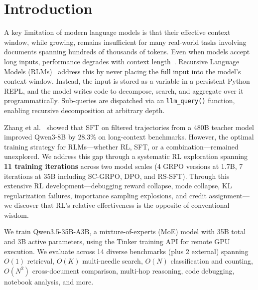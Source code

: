 \documentclass{article}
\begin{document}
\section{Introduction}
\label{sec:intro}

A key limitation of modern language models is that their effective context window, while growing, remains insufficient for many real-world tasks involving documents spanning hundreds of thousands of tokens. Even when models accept long inputs, performance degrades with context length~\cite{hsieh2024ruler}. Recursive Language Models (RLMs)~\cite{zhang2026rlm} address this by never placing the full input into the model's context window. Instead, the input is stored as a variable in a persistent Python REPL, and the model writes code to decompose, search, and aggregate over it programmatically. Sub-queries are dispatched via an \texttt{llm\_query()} function, enabling recursive decomposition at arbitrary depth.

Zhang et al.~\cite{zhang2026rlm} showed that SFT on filtered trajectories from a 480B teacher model improved Qwen3-8B by 28.3\% on long-context benchmarks. However, the optimal training strategy for RLMs---whether RL, SFT, or a combination---remained unexplored. We address this gap through a systematic RL exploration spanning \textbf{11 training iterations} across two model scales (4 GRPO versions at 1.7B, 7 iterations at 35B including SC-GRPO, DPO, and RS-SFT). Through this extensive RL development---debugging reward collapse, mode collapse, KL regularization failures, importance sampling explosions, and credit assignment---we discover that RL's relative effectiveness is the opposite of conventional wisdom.

We train Qwen3.5-35B-A3B, a mixture-of-experts (MoE) model with 35B total and 3B active parameters, using the Tinker training API for remote GPU execution. We evaluate across 14 diverse benchmarks (plus 2 external) spanning $O(1)$ retrieval, $O(K)$ multi-needle search, $O(N)$ classification and counting, $O(N^2)$ cross-document comparison, multi-hop reasoning, code debugging, notebook analysis, and more.
\end{document}
